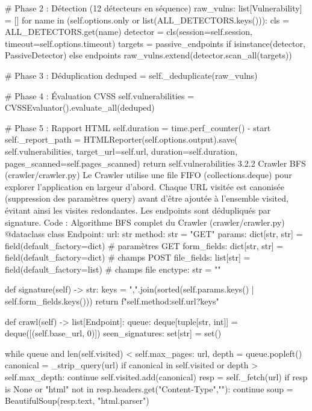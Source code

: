         # Phase 2 : Détection (12 détecteurs en séquence)
        raw_vulns: list[Vulnerability] = []
        for name in (self.options.only or list(ALL_DETECTORS.keys())):
            cls = ALL_DETECTORS.get(name)
            detector = cls(session=self.session, timeout=self.options.timeout)
            targets = passive_endpoints if isinstance(detector, PassiveDetector) else endpoints
            raw_vulns.extend(detector.scan_all(targets))

        # Phase 3 : Déduplication
        deduped = self._deduplicate(raw_vulns)

        # Phase 4 : Évaluation CVSS
        self.vulnerabilities = CVSSEvaluator().evaluate_all(deduped)

        # Phase 5 : Rapport HTML
        self.duration = time.perf_counter() - start
        self._report_path = HTMLReporter(self.options.output).save(
            self.vulnerabilities, target_url=self.url,
            duration=self.duration, pages_scanned=self.pages_scanned)
        return self.vulnerabilities
3.2.2  Crawler BFS (crawler/crawler.py)
Le Crawler utilise une file FIFO (collections.deque) pour explorer l'application en largeur d'abord. Chaque URL visitée est canonisée (suppression des paramètres query) avant d'être ajoutée à l'ensemble visited, évitant ainsi les visites redondantes. Les endpoints sont dédupliqués par signature.
Code : Algorithme BFS complet du Crawler (crawler/crawler.py)
@dataclass
class Endpoint:
    url: str
    method: str = "GET"
    params: dict[str, str] = field(default_factory=dict)       # paramètres GET
    form_fields: dict[str, str] = field(default_factory=dict)  # champs POST
    file_fields: list[str] = field(default_factory=list)       # champs file
    enctype: str = ""

    def signature(self) -> str:
        keys = ",".join(sorted(self.params.keys() | self.form_fields.keys()))
        return f"{self.method}:{self.url}?{keys}"

def crawl(self) -> list[Endpoint]:
    queue: deque[tuple[str, int]] = deque([(self.base_url, 0)])
    seen_signatures: set[str] = set()

    while queue and len(self.visited) < self.max_pages:
        url, depth = queue.popleft()
        canonical = _strip_query(url)
        if canonical in self.visited or depth > self.max_depth:
            continue
        self.visited.add(canonical)
        resp = self._fetch(url)
        if resp is None or "html" not in resp.headers.get("Content-Type",""):
            continue
        soup = BeautifulSoup(resp.text, "html.parser")

